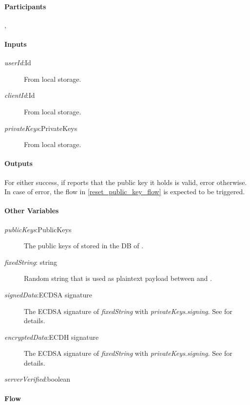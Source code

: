 \documentclass[a4paper,10pt,draft]{article}
\newcommand{\signedData}{\emph{signedData}}
\newcommand{\encryptedData}{\emph{encryptedData}}
\newcommand{\serverVerified}{\emph{serverVerified}}
\newcommand{\privateKeys}{\emph{privateKeys}}
\newcommand{\publicKeys}{\emph{publicKeys}}
\newcommand{\signingKey}{\privateKeys{}.\emph{signing}}
\newcommand{\userId}{\emph{userId}}
\newcommand{\clientId}{\emph{clientId}}
\newcommand{\fixedString}{\emph{fixedString}}
\begin{document}
\paragraph{Participants} \Client{}, \Server{}

\paragraph{Inputs}
\SpecialItem
\begin{description}
 \item[\userId{}:Id] From \Client{} local storage.
 \item[\clientId{}:Id] From \Client{} local storage.
 \item[\privateKeys{}:PrivateKeys] From \Client{} local storage.
\end{description}

\paragraph{Outputs}
For \Client{} either success, if \Server{} reports that the public key it holds is valid, error otherwise. In case of error, the flow in \ref{reset_public_key_flow} is expected to 
be triggered.

\paragraph{Other Variables}
\SpecialItem
\begin{description}
 \item[\publicKeys{}:PublicKeys] The public keys of \Client{} stored in the DB of \Server{}.
 \item[\fixedString{}: string] Random string that is used as plaintext payload between \Server{} and \Client{}.
 \item[\signedData{}:ECDSA signature] The ECDSA signature of \fixedString{} with \signingKey{}. See \cite{crypto_spec} for details.
 \item[\encryptedData{}:ECDH signature] The ECDSA signature of \fixedString{} with \signingKey{}. See \cite{crypto_spec} for details.
 \item[\serverVerified{}:boolean]
\end{description}

\paragraph{Flow}
\end{document}
